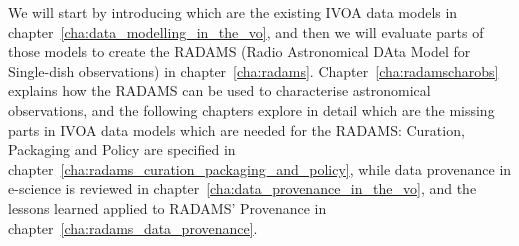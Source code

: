 	
	We will start by introducing which are the existing IVOA data
	models in chapter~\ref{cha:data_modelling_in_the_vo}, and then
	we will evaluate parts of those models to create the RADAMS
	(Radio Astronomical DAta Model for Single-dish observations) in
	chapter~\ref{cha:radams}. Chapter~\ref{cha:radamscharobs}
	explains how the RADAMS can be used to characterise
	astronomical observations, and the following chapters explore
	in detail which are the missing parts in IVOA data models which
	are needed for the RADAMS: Curation, Packaging and Policy are
	specified in
	chapter~\ref{cha:radams_curation_packaging_and_policy}, while
	data provenance in e-science is reviewed in
	chapter~\ref{cha:data_provenance_in_the_vo}, and the lessons
	learned applied to RADAMS' Provenance in
	chapter~\ref{cha:radams_data_provenance}.
	
